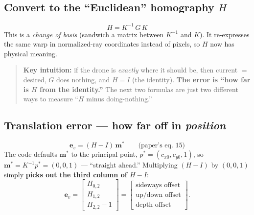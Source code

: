 \documentclass[11pt]{article}
\begin{document}
\subsection{Convert to the ``Euclidean'' homography $H$}
\[
\boxed{\,H = K^{-1}\,G\,K\,}
\]
This is a \emph{change of basis} (sandwich a matrix between $K^{-1}$ and $K$).
It re-expresses the same warp in normalized-ray coordinates instead of pixels,
so $H$ now has physical meaning.

\begin{quote}
\textbf{Key intuition:} if the drone is \emph{exactly} where it should be, then
current $=$ desired, $G$ does nothing, and $H=I$ (the identity). \textbf{The
error is ``how far is $H$ from the identity.''} The next two formulas are just
two different ways to measure ``$H$ minus doing-nothing.''
\end{quote}

\subsection{Translation error --- how far off in \emph{position}}
\[
\mathbf{e}_v=(H-I)\,\mathbf{m}^{*}\qquad\text{(paper's eq.\ 15)}
\]
The code defaults $\mathbf{m}^{*}$ to the principal point,
$p^{*}=(c_{x0},c_{y0},1)$, so $\mathbf{m}^{*}=K^{-1}p^{*}=(0,0,1)$ --- ``straight
ahead.'' Multiplying $(H-I)$ by $(0,0,1)$ simply \textbf{picks out the third
column of $H-I$}:
\[
\mathbf{e}_v=\begin{bmatrix} H_{0,2}\\ H_{1,2}\\ H_{2,2}-1\end{bmatrix}
=\begin{bmatrix}\text{sideways offset}\\ \text{up/down offset}\\ \text{depth
offset}\end{bmatrix}.
\]
\end{document}
